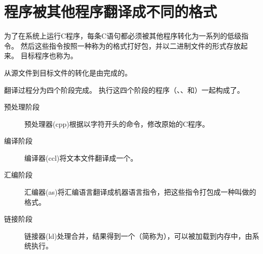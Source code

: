 
\section{程序被其他程序翻译成不同的格式}
{
    为了在系统上运行C程序，每条C语句都必须被其他程序转化为一系列的低级指令。
    然后这些指令按照一种称为的格式打好包，并以二进制文件的形式存放起来。
    目标程序也称为。

    从源文件到目标文件的转化是由完成的。

    翻译过程分为四个阶段完成。
    执行这四个阶段的程序（、、和）一起构成了。

    \begin{description}
        \item[预处理阶段] 预处理器(cpp)根据以字符\emcode{\#}开头的命令，修改原始的C程序。
        \item[编译阶段] 编译器(ccl)将文本文件翻译成一个。
        \item[汇编阶段] 汇编器(as)将汇编语言翻译成机器语言指令，把这些指令打包成一种叫做的格式。
        \item[链接阶段] 链接器(ld)处理合并，结果得到一个（简称为），可以被加载到内存中，由系统执行。
    \end{description}
}

